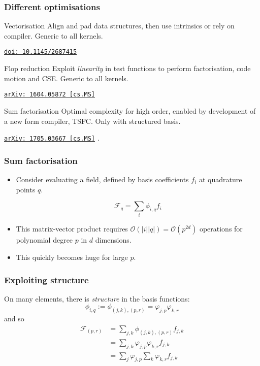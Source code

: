 \documentclass[presentation]{beamer}
\newcommand{\arxivlink}[2]{%
  \href{http://www.arxiv.org/abs/#1}%
  {{\small\texttt{arXiv:\,#1\,[#2]}}}%
}
\newcommand{\doilink}[1]{%
  \href{http://dx.doi.org/#1}%
  {{\small\texttt{doi:\,#1}{}}}%
}
\begin{document}
\begin{frame}
  \frametitle{Different optimisations}
\begin{block}{Vectorisation}
  Align and pad data structures, then use intrinsics or rely on
  compiler. Generic to all kernels.

  \cite{Luporini:2015} \doilink{10.1145/2687415}
\end{block}

\begin{block}{Flop reduction}
  Exploit \emph{linearity} in test functions to perform factorisation,
  code motion and CSE.  Generic to all kernels.

  \cite{Luporini:2017} \arxivlink{1604.05872}{cs.MS}
\end{block}

\begin{block}{Sum factorisation}
  Optimal complexity for high order, enabled by development of a new
  form compiler, TSFC.  Only with structured basis.

  \cite{Homolya:2017} \arxivlink{1705.03667}{cs.MS}.
\end{block}
\end{frame}
\begin{frame}
  \frametitle{Sum factorisation}
  \begin{itemize}
  \item Consider evaluating a field, defined by basis coefficients
    $f_i$ at quadrature points $q$.

  \begin{equation*}
    \mathcal{F}_q = \sum_i \phi_{i,q} f_i
  \end{equation*}

  \item This matrix-vector product requires $\mathcal{O}(|i||q|) =
    \mathcal{O}(p^{2d})$ operations for polynomial degree $p$ in $d$
    dimensions.
  \item This quickly becomes huge for large $p$.
\end{itemize}
\end{frame}

\begin{frame}
  \frametitle{Exploiting structure}
  On many elements, there is \emph{structure} in the basis functions:
  \begin{equation*}
    \phi_{i,q} := \phi_{(j,k),(p,r)} = \varphi_{j,p}\varphi_{k,r}
  \end{equation*}
  and so
  \begin{align*}
    \mathcal{F}_{(p,r)} &= \sum_{j,k} \phi_{(j,k),(p,r)} f_{j,k} \\
                        &= \sum_{j,k} \varphi_{j,p}\varphi_{k,r} f_{j,k} \\
                        &= \sum_j \varphi_{j,p} \sum_k \varphi_{k,r} f_{j,k}
  \end{align*}
\end{frame}
\end{document}
